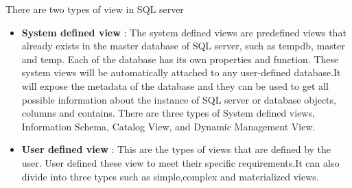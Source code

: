 There are two types of view in SQL server
\begin{itemize}
    \item \textbf{System defined view }: The system defined views are predefined views that already exists in the  master database of SQL server, such as tempdb, master and temp. Each of the database has its own properties and function. These system views will be automatically attached to any user-defined database.It will expose the metadata of the database and they can be used to get all possible information about the instance of SQL server or database objects, columns and contains. There are three types of System defined views, Information Schema, Catalog View, and Dynamic Management View. \cite{chauhan-2024}
    \item \textbf{User defined view }: This are the types of views that are defined by the user. User defined these view to meet their specific requirements.It can also divide into three types such as simple,complex and materialized views.\cite{javapoint-author-2024}
\end{itemize}
   
